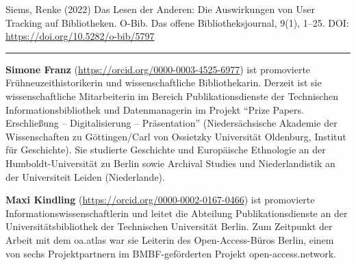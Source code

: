 \documentclass[a4paper,
fontsize=11pt,
oneside,
numbers=noperiodatend,
parskip=half-,
bibliography=totoc,
final
]{scrartcl}
\begin{document}
Siems, Renke (2022) Das Lesen der Anderen: Die Auswirkungen von User
Tracking auf Bibliotheken. O-Bib. Das offene Bibliotheksjournal, 9(1),
1--25. DOI: \url{https://doi.org/10.5282/o-bib/5797}

\begin{center}\rule{0.5\linewidth}{0.5pt}\end{center}

\textbf{Simone Franz} (\url{https://orcid.org/0000-0003-4525-6977}) ist
promovierte Frühneuzeithistorikerin und wissenschaftliche
Bibliothekarin. Derzeit ist sie wissenschaftliche Mitarbeiterin im
Bereich Publikationsdienste der Technischen Informationsbibliothek und
Datenmanagerin im Projekt \enquote{Prize Papers. Erschließung --
Digitalisierung -- Präsentation} (Niedersächsische Akademie der
Wissenschaften zu Göttingen/Carl von Ossietzky Universität Oldenburg,
Institut für Geschichte). Sie studierte Geschichte und Europäische
Ethnologie an der Humboldt-Universität zu Berlin sowie Archival Studies
und Niederlandistik an der Universiteit Leiden (Niederlande).

\textbf{Maxi Kindling} (\url{https://orcid.org/0000-0002-0167-0466}) ist promovierte Informationswissenschaftlerin und
leitet die Abteilung Publikationsdienste an der Universitätsbibliothek
der Technischen Universität Berlin. Zum Zeitpunkt der Arbeit mit dem
oa.atlas war sie Leiterin des Open-Access-Büros Berlin, einem von sechs
Projektpartnern im BMBF-geförderten Projekt open-access.network.
\end{document}
